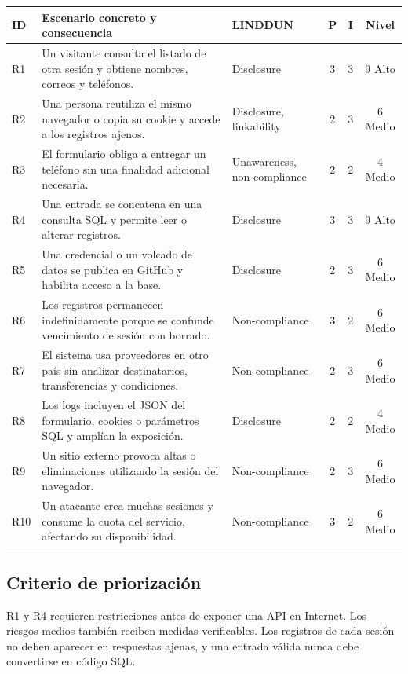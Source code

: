 \documentclass[11pt,a4paper]{article}
\begin{document}
{\small
\begin{tabularx}{\textwidth}{@{}P{.7cm}YP{2.1cm}ccc@{}}
\toprule
\textbf{ID} & \textbf{Escenario concreto y consecuencia} & \textbf{LINDDUN} & \textbf{P} & \textbf{I} & \textbf{Nivel}\\
\midrule
R1 & Un visitante consulta el listado de otra sesión y obtiene nombres, correos y teléfonos. & Disclosure & 3 & 3 & 9 Alto\\
R2 & Una persona reutiliza el mismo navegador o copia su cookie y accede a los registros ajenos. & Disclosure, linkability & 2 & 3 & 6 Medio\\
R3 & El formulario obliga a entregar un teléfono sin una finalidad adicional necesaria. & Unawareness, non-compliance & 2 & 2 & 4 Medio\\
R4 & Una entrada se concatena en una consulta SQL y permite leer o alterar registros. & Disclosure & 3 & 3 & 9 Alto\\
R5 & Una credencial o un volcado de datos se publica en GitHub y habilita acceso a la base. & Disclosure & 2 & 3 & 6 Medio\\
R6 & Los registros permanecen indefinidamente porque se confunde vencimiento de sesión con borrado. & Non-compliance & 3 & 2 & 6 Medio\\
R7 & El sistema usa proveedores en otro país sin analizar destinatarios, transferencias y condiciones. & Non-compliance & 2 & 3 & 6 Medio\\
R8 & Los logs incluyen el JSON del formulario, cookies o parámetros SQL y amplían la exposición. & Disclosure & 2 & 2 & 4 Medio\\
R9 & Un sitio externo provoca altas o eliminaciones utilizando la sesión del navegador. & Non-compliance & 2 & 3 & 6 Medio\\
R10 & Un atacante crea muchas sesiones y consume la cuota del servicio, afectando su disponibilidad. & Non-compliance & 3 & 2 & 6 Medio\\
\bottomrule
\end{tabularx}}

\subsection{Criterio de priorización}
R1 y R4 requieren restricciones antes de exponer una API en Internet. Los riesgos medios también reciben medidas verificables. Los registros de cada sesión no deben aparecer en respuestas ajenas, y una entrada válida nunca debe convertirse en código SQL.
\end{document}
